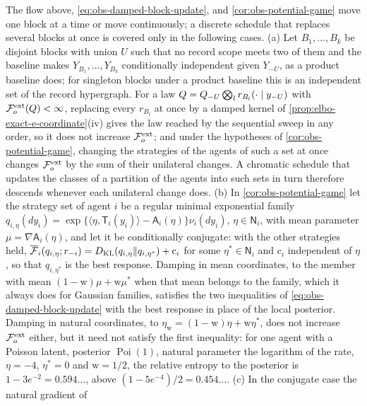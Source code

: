 The flow above, \eqref{eq:obs-damped-block-update}, and
\cref{cor:obs-potential-game} move one block at a time or move continuously; a
discrete schedule that replaces several blocks at once is covered only in the
following cases. (a) Let $B_1,\dots,B_k$ be disjoint blocks with union $U$ such
that no record scope meets two of them and the baseline makes
$Y_{B_1},\dots,Y_{B_k}$ conditionally independent given $Y_{-U}$, as a product
baseline does; for singleton blocks under a product baseline this is an
independent set of the record hypergraph. For a law
$Q=Q_{-U}\bigotimes_lr_{B_l}(\cdot\mid y_{-U})$ with
$\mathcal F^{\mathrm{ext}}_o(Q)<\infty$, replacing every $r_{B_l}$ at once by a damped
kernel of \cref{prop:elbo-exact-e-coordinate}(iv) gives the law reached by the
sequential sweep in any order, so it does not increase $\mathcal F^{\mathrm{ext}}_o$;
and under the hypotheses of \cref{cor:obs-potential-game}, changing the strategies
of the agents of such a set at once changes $\mathcal F^{\mathrm{ext}}_o$ by the sum
of their unilateral changes. A chromatic schedule that updates the classes of a
partition of the agents into such sets in turn therefore descends whenever each
unilateral change does. (b) In \cref{cor:obs-potential-game} let the strategy set of
agent $i$ be a regular minimal exponential family
$q_{i,\eta}(dy_i)=\exp\{\langle\eta,\mathsf T_i(y_i)\rangle-\mathsf A_i(\eta)\}\nu_i(dy_i)$,
$\eta\in\mathsf N_i$, with mean parameter $\mu=\nabla\mathsf A_i(\eta)$, and let it
be conditionally conjugate: with the other strategies held,
$\overline{\mathcal F}_i(q_{i,\eta};r_{-i})=D_{\mathrm{KL}}(q_{i,\eta}\Vert q_{i,\eta^*})+\mathrm c_i$
for some $\eta^*\in\mathsf N_i$ and $\mathrm c_i$ independent of $\eta$, so that
$q_{i,\eta^*}$ is the best response. Damping in mean coordinates, to the member with
mean $(1-\mathrm w)\mu+\mathrm w\mu^*$ when that mean belongs to the family, which it
always does for Gaussian families, satisfies the two inequalities of
\eqref{eq:obs-damped-block-update} with the best response in place of the local
posterior. Damping in natural coordinates, to
$\eta_{\mathrm w}=(1-\mathrm w)\eta+\mathrm w\eta^*$, does not increase
$\mathcal F^{\mathrm{ext}}_o$ either, but it need not satisfy the first inequality:
for one agent with a Poisson latent, posterior $\operatorname{Poi}(1)$, natural
parameter the logarithm of the rate, $\eta=-4$, $\eta^*=0$ and $\mathrm w=1/2$, the
relative entropy to the posterior is $1-3e^{-2}=0.594\ldots$, above
$(1-5e^{-4})/2=0.454\ldots$. (c) In the conjugate case the natural gradient of
